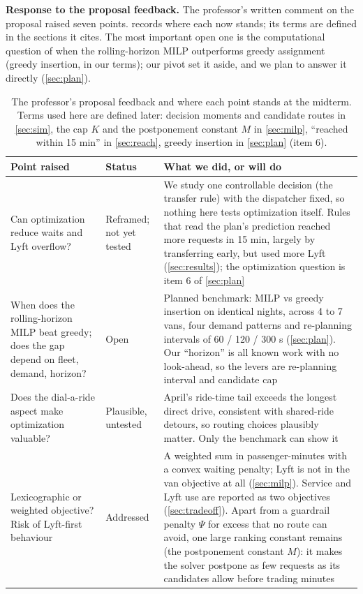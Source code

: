 \documentclass{article}
\begin{document}
\textbf{Response to the proposal feedback.} The professor's written comment on the proposal raised seven points.  records where each now stands; its terms are defined in the sections it cites. The most important open one is the computational question of when the rolling-horizon MILP outperforms greedy assignment (greedy insertion, in our terms); our pivot set it aside, and we plan to answer it directly (\cref{sec:plan}).

\begin{table}[t]
\centering\small
\caption{The professor's proposal feedback and where each point stands at the midterm. Terms used here are defined later: decision moments and candidate routes in \cref{sec:sim}, the cap $K$ and the postponement constant $M$ in \cref{sec:milp}, ``reached within 15 min'' in \cref{sec:reach}, greedy insertion in \cref{sec:plan} (item 6).}\label{tab:feedback}
\begin{tabularx}{\textwidth}{@{}P{4.4cm}P{1.9cm}L@{}}
\toprule
\textbf{Point raised} & \textbf{Status} & \textbf{What we did, or will do}\\
\midrule
Can optimization reduce waits and Lyft overflow? & Reframed; not yet tested & We study one controllable decision (the transfer rule) with the dispatcher fixed, so nothing here tests optimization itself. Rules that read the plan's prediction reached more requests in 15 min, largely by transferring early, but used more Lyft (\cref{sec:results}); the optimization question is item 6 of \cref{sec:plan}\\
When does the rolling-horizon MILP beat greedy; does the gap depend on fleet, demand, horizon? & Open & Planned benchmark: MILP vs greedy insertion on identical nights, across 4 to 7 vans, four demand patterns and re-planning intervals of 60 / 120 / 300 s (\cref{sec:plan}). Our ``horizon'' is all known work with no look-ahead, so the levers are re-planning interval and candidate cap\\
Does the dial-a-ride aspect make optimization valuable? & Plausible, untested & April's ride-time tail exceeds the longest direct drive, consistent with shared-ride detours, so routing choices plausibly matter. Only the benchmark can show it\\
Lexicographic or weighted objective? Risk of Lyft-first behaviour & Addressed & A weighted sum in passenger-minutes with a convex waiting penalty; Lyft is not in the van objective at all (\cref{sec:milp}). Service and Lyft use are reported as two objectives (\cref{sec:tradeoff}). Apart from a guardrail penalty $\Psi$ for excess that no route can avoid, one large ranking constant remains (the postponement constant $M$): it makes the solver postpone as few requests as its candidates allow before trading minutes\\

\end{tabularx}
\end{table}
\end{document}
